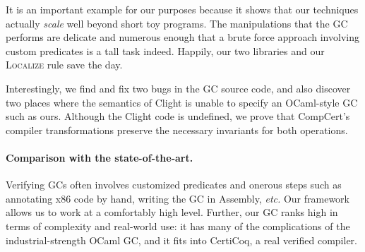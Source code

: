 \documentclass[sigplan, anonymous=false, review=false]{acmart}
\newcommand{\infrulestyle}[1]{\textsc{#1}}
\begin{document}
It is an important example for our purposes because it shows that our
techniques actually \emph{scale} well beyond short toy programs. The manipulations 
that the GC performs are delicate and numerous enough that a brute force
approach involving custom predicates is a tall task indeed. 
Happily, our two libraries and our \infrulestyle{Localize} rule save the day.

Interestingly, we find and fix two bugs in the GC source code, and also 
discover two places where the semantics of Clight is 
unable to specify an OCaml-style GC such as ours. 
Although the Clight code is undefined, we prove that 
CompCert's compiler transformations preserve the necessary invariants
for both operations. 

\paragraph{Comparison with the state-of-the-art.} 
Verifying GCs often involves customized predicates and onerous steps 
such as annotating x86 code by hand, writing the GC in Assembly, \emph{etc.}
Our framework allows us to work at a comfortably high level. 
Further, our GC ranks high in terms of complexity and real-world use:
it has many of the complications of the industrial-strength OCaml GC, 
and it fits into CertiCoq, a real verified compiler.
\end{document}
